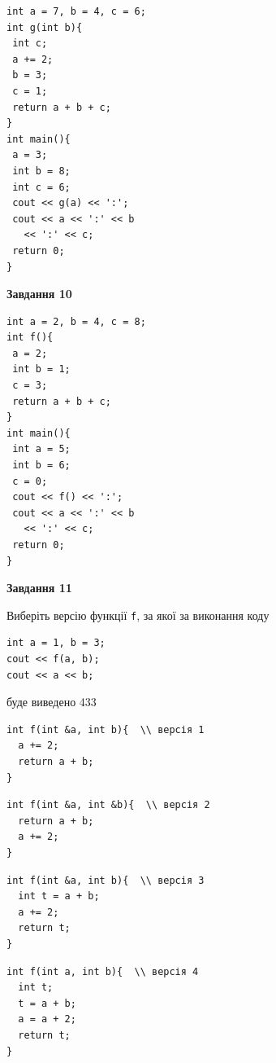 \documentclass[12pt, ukrainian]{article}
\def\code#1{\Verb!#1!}
\begin{document}
{\begin {large}
\begin{minipage}[t]{7.0cm}
\begin{verbatim}
int a = 7, b = 4, c = 6;
int g(int b){
 int c;
 a += 2;
 b = 3;
 c = 1;
 return a + b + c;
}
int main(){
 a = 3;
 int b = 8;
 int c = 6;
 cout << g(a) << ':';
 cout << a << ':' << b 
   << ':' << c;
 return 0;
}
\end{verbatim}



\begin{center}
\textbf{Завдання 10}
\end{center}
\vspace{-8mm}

\begin{verbatim}
int a = 2, b = 4, c = 8;
int f(){
 a = 2;
 int b = 1;
 c = 3;
 return a + b + c;
}
int main(){
 int a = 5;
 int b = 6;
 c = 0;
 cout << f() << ':';
 cout << a << ':' << b 
   << ':' << c;
 return 0;
}
\end{verbatim}

\end{minipage}
\vline \hspace{1mm}
\begin{minipage}[t]{11.0cm}

\begin{center}
\textbf{Завдання 11}
\end{center}
Виберіть версію функції \code{f}, за якої за виконання коду
\begin{verbatim}
int a = 1, b = 3;
cout << f(a, b);
cout << a << b;
\end{verbatim}

буде виведено 433

\begin{verbatim}
int f(int &a, int b){  \\ версія 1
  a += 2;
  return a + b;
}
\end{verbatim}

\vspace{-8mm}\begin{verbatim}
int f(int &a, int &b){  \\ версія 2
  return a + b;
  a += 2;
}
\end{verbatim}

\vspace{-8mm}\begin{verbatim}
int f(int &a, int b){  \\ версія 3
  int t = a + b;
  a += 2;
  return t;
}
\end{verbatim}

\vspace{-8mm}\begin{verbatim}
int f(int a, int b){  \\ версія 4
  int t;
  t = a + b;
  a = a + 2;
  return t;
}
\end{verbatim}




\end{minipage}
\end{large}}
\end{document}
